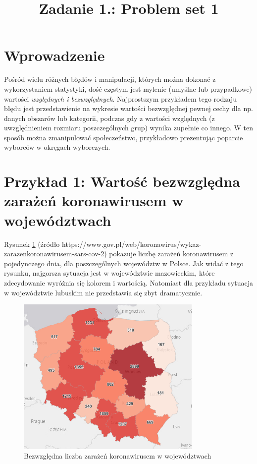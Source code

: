 \documentclass{classrep}
\author{%
    \studentinfo[239671@edu.p.lodz.pl]{Jan Karwowski}{239671}
}
\title{Zadanie 1.: Problem set 1}
\begin{document}
\maketitle
\thispagestyle{fancyplain}

\section{Wprowadzenie}

Pośród wielu różnych błędów i manipulacji, których można dokonać z wykorzystaniem statystyki, dość
częstym jest mylenie (umyślne lub przypadkowe) wartości \emph{względnych i bezwzględnych}.
Najprostszym przykładem tego rodzaju błędu jest przedstawienie na wykresie wartości bezwzględnej
pewnej cechy dla np. danych obszarów lub kategorii, podczas gdy z wartości względnych (z
uwzględnieniem rozmiaru poszczególnych grup) wynika zupełnie co innego. W ten sposób można
zmanipulować społeczeństwo, przykładowo prezentując poparcie wyborców w okręgach wyborczych.

\section{Przykład 1: Wartość bezwzględna zarażeń koronawirusem w województwach}

Rysunek \ref{wzgledne_bezwzgledne} (źródło
https://www.gov.pl/web/koronawirus/wykaz-zarazen\-koronawirusem-sars-cov-2) pokazuje liczbę zarażeń
koronawirusem z pojedynczego dnia, dla poszczególnych województw w Polsce. Jak widać z tego rysunku,
najgorsza sytuacja jest w województwie mazowieckim, które zdecydowanie wyróżnia się kolorem i
wartością. Natomiast dla przykładu sytuacja w województwie lubuskim nie przedstawia się zbyt
dramatycznie. 

\begin{figure}
    \centering
    \includegraphics[width=0.8\textwidth,keepaspectratio]{img/wzgledne_bezwzgledne.png}
    \caption{Bezwzględna liczba zarażeń koronawirusem w województwach}
    \label{wzgledne_bezwzgledne}
\end{figure}
\end{document}
